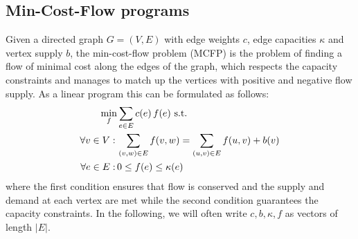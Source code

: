 \documentclass{article}
\begin{document}
\subsection{Min-Cost-Flow programs}
Given a directed graph $G=(V,E)$ with edge weights $c$, edge capacities $\kappa$ and vertex supply $b$, the min-cost-flow problem (MCFP) is the problem of finding a flow of minimal cost along the edges of the graph, which respects the capacity constraints and manages to match up the vertices with positive and negative flow supply. As a linear program this can be formulated as follows:
\begin{align}\label{MCFP}
\min_f &\sum_{e \in E} c(e)\,f(e) \textnormal{ s.t.}\nonumber\\
\forall v \in V: \,&\sum_{(v,w) \in E} f(v,w) = \sum_{(u,v) \in E} f(u,v) + b(v) \\
\forall	e \in E: \,&0 \leq f(e) \leq \kappa(e) \nonumber
\end{align}
where the first condition ensures that flow is conserved and the supply and demand at each vertex are met while the second condition guarantees the capacity constraints. In the following, we will often write $c, b, \kappa, f$ as vectors of length $| E|$.
\end{document}
